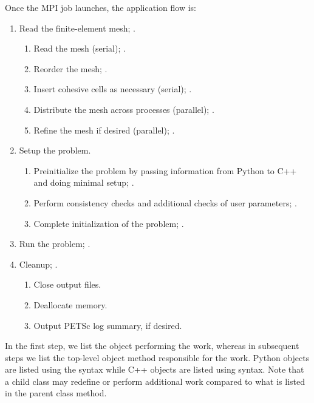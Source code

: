 Once the MPI job launches, the application flow is:
\begin{enumerate}
\item Read the finite-element mesh; .
  \begin{enumerate}
  \item Read the mesh (serial); .
  \item Reorder the mesh; .
  \item Insert cohesive cells as necessary (serial); .
  \item Distribute the mesh across processes (parallel); .
  \item Refine the mesh if desired (parallel); .
  \end{enumerate}
\item Setup the problem.
  \begin{enumerate}
  \item Preinitialize the problem by passing information from Python
    to C++ and doing minimal setup; .
  \item Perform consistency checks and additional checks of user
    parameters; .
  \item Complete initialization of the problem;
    .
  \end{enumerate}
\item Run the problem; .
\item Cleanup; .
  \begin{enumerate}
  \item Close output files.
  \item Deallocate memory.
  \item Output PETSc log summary, if desired.
  \end{enumerate}
\end{enumerate}

In the first step, we list the object performing the work, whereas in
subsequent steps we list the top-level object method responsible for
the work. Python objects are listed using the 
syntax while C++ objects are listed using 
syntax. Note that a child class may redefine or perform additional
work compared to what is listed in the parent class method.

